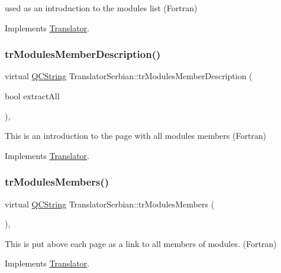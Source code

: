 used as an introduction to the modules list (Fortran) 

Implements \mbox{\hyperlink{class_translator}{Translator}}.

\mbox{\label{class_translator_serbian_a4df7aa8f3bbbec09c7e14c3496441af0}} 
\subsubsection{\texorpdfstring{trModulesMemberDescription()}{trModulesMemberDescription()}}
{\footnotesize\ttfamily virtual \mbox{\hyperlink{class_q_c_string}{Q\+C\+String}} Translator\+Serbian\+::tr\+Modules\+Member\+Description (\begin{DoxyParamCaption}\item[{bool}]{extract\+All }\end{DoxyParamCaption})\hspace{0.3cm}{\ttfamily [inline]}, {\ttfamily [virtual]}}

This is an introduction to the page with all modules members (Fortran) 

Implements \mbox{\hyperlink{class_translator}{Translator}}.

\mbox{\label{class_translator_serbian_a53684bca0a00b94d440e65406b64e8b2}} 
\subsubsection{\texorpdfstring{trModulesMembers()}{trModulesMembers()}}
{\footnotesize\ttfamily virtual \mbox{\hyperlink{class_q_c_string}{Q\+C\+String}} Translator\+Serbian\+::tr\+Modules\+Members (\begin{DoxyParamCaption}{ }\end{DoxyParamCaption})\hspace{0.3cm}{\ttfamily [inline]}, {\ttfamily [virtual]}}

This is put above each page as a link to all members of modules. (Fortran) 

Implements \mbox{\hyperlink{class_translator}{Translator}}.

